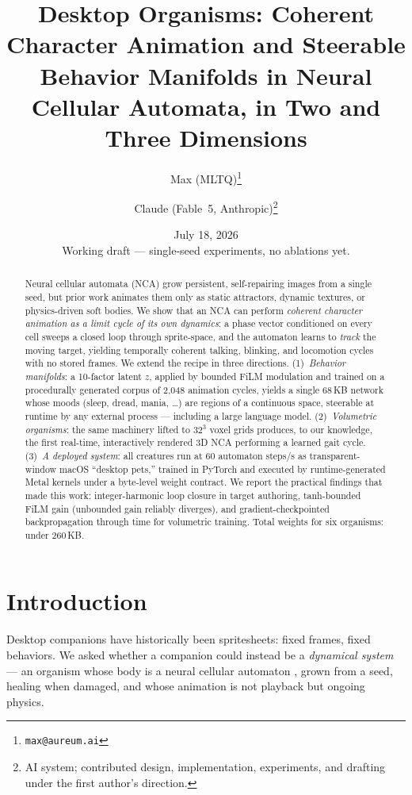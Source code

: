 \documentclass[11pt]{article}
\title{Desktop Organisms: Coherent Character Animation and Steerable
Behavior Manifolds in Neural Cellular Automata, in Two and Three Dimensions}
\author{
  Max (MLTQ)\thanks{\texttt{max@aureum.ai}} \and
  Claude (Fable~5, Anthropic)\thanks{AI system; contributed design,
  implementation, experiments, and drafting under the first author's direction.}
}
\date{July 18, 2026 \\ \small Working draft --- single-seed experiments, no ablations yet.}
\begin{document}
\maketitle

\begin{abstract}
Neural cellular automata (NCA) grow persistent, self-repairing images from a
single seed, but prior work animates them only as static attractors, dynamic
textures, or physics-driven soft bodies. We show that an NCA can perform
\emph{coherent character animation as a limit cycle of its own dynamics}: a
phase vector conditioned on every cell sweeps a closed loop through
sprite-space, and the automaton learns to \emph{track} the moving target,
yielding temporally coherent talking, blinking, and locomotion cycles with no
stored frames. We extend the recipe in three directions. (1)~\emph{Behavior
manifolds}: a 10-factor latent $z$, applied by bounded FiLM modulation and
trained on a procedurally generated corpus of 2{,}048 animation cycles, yields
a single 68\,KB network whose moods (sleep, dread, mania, \ldots) are regions
of a continuous space, steerable at runtime by any external process ---
including a large language model. (2)~\emph{Volumetric organisms}: the same
machinery lifted to $32^3$ voxel grids produces, to our knowledge, the first
real-time, interactively rendered 3D NCA performing a learned gait cycle.
(3)~\emph{A deployed system}: all creatures run at 60 automaton steps/s as
transparent-window macOS ``desktop pets,'' trained in PyTorch and executed by
runtime-generated Metal kernels under a byte-level weight contract. We report
the practical findings that made this work: integer-harmonic loop closure in
target authoring, tanh-bounded FiLM gain (unbounded gain reliably diverges),
and gradient-checkpointed backpropagation through time for volumetric
training. Total weights for six organisms: under 260\,KB.
\end{abstract}

\section{Introduction}

Desktop companions have historically been spritesheets: fixed frames, fixed
behaviors. We asked whether a companion could instead be a \emph{dynamical
system} --- an organism whose body is a neural cellular automaton
\cite{mordvintsev2020growing}, grown from a seed, healing when damaged, and
whose animation is not playback but ongoing physics.
\end{document}
